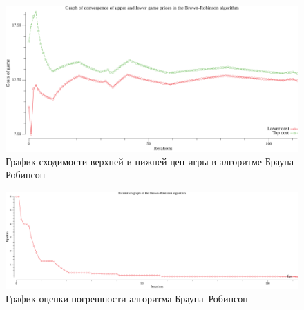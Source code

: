 \begin{figure}
  \centering
  \includegraphics[scale=0.5]{../../artifacts/lw1/costs.png}
  \caption{График сходимости верхней и нижней цен игры в алгоритме Брауна--Робинсон}
  \label{fig:fig4}
\end{figure}

\begin{figure}
  \centering
\includegraphics[scale=0.5]{../../artifacts/lw1/estimation.png}
  \caption{График оценки погрешности алгоритма Брауна--Робинсон}
  \label{fig:fig5}
\end{figure}

